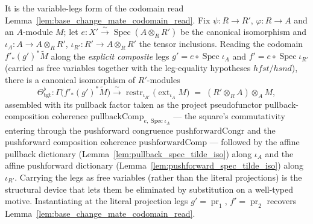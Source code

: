 \begin{lemma}

  \label{lem:base_change_mate_codomain_read_legs}
  It is the variable-legs form of the codomain read
  Lemma~\ref{lem:base_change_mate_codomain_read}. Fix \(\psi : R \to R'\),
  \(\varphi : R \to A\) and an \(A\)-module \(M\); let \(e : X' \xrightarrow{\sim}
  \operatorname{Spec}(A \otimes_R R')\) be the canonical isomorphism and
  \(\iota_A : A \to A \otimes_R R'\), \(\iota_{R'} : R' \to A \otimes_R R'\) the tensor
  inclusions. Reading the codomain \(f'_*(g')^*\widetilde M\) along the \emph{explicit composite}
  legs \(g' = e \circ \operatorname{Spec}\iota_A\) and \(f' = e \circ \operatorname{Spec}\iota_{R'}\)
  (carried as free variables together with the leg-equality hypotheses
  \(\mathit{hfst}/\mathit{hsnd}\)), there is a canonical isomorphism of \(R'\)-modules
  \[
    \Theta_{\mathrm{tgt}}^{\flat} :
    \Gamma\bigl(f'_*(g')^*\widetilde M\bigr)
    \xrightarrow{\ \sim\ }
    \operatorname{restr}_{\iota_{R'}}\bigl(\operatorname{ext}_{\iota_A} M\bigr)
    \;=\; (R' \otimes_R A) \otimes_A M ,
  \]
  assembled with its pullback factor taken as the project pseudofunctor pullback-composition
  coherence \(\mathrm{pullbackComp}_{e,\operatorname{Spec}\iota_A}\) — the square's commutativity
  entering through the pushforward congruence \(\mathrm{pushforwardCongr}\) and the pushforward
  composition coherence \(\mathrm{pushforwardComp}\) — followed by the affine pullback dictionary
  (Lemma~\ref{lem:pullback_spec_tilde_iso}) along \(\iota_A\) and the affine pushforward dictionary
  (Lemma~\ref{lem:pushforward_spec_tilde_iso}) along \(\iota_{R'}\). Carrying the legs as free
  variables (rather than the literal projections) is the structural device that lets them be
  eliminated by substitution on a well-typed motive. Instantiating at the
  literal projection legs \(g' = \operatorname{pr}_1\), \(f' = \operatorname{pr}_2\) recovers
  Lemma~\ref{lem:base_change_mate_codomain_read}.
\end{lemma}

